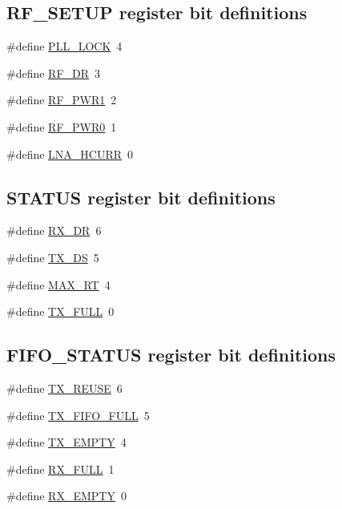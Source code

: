 \subsection*{RF\_\-SETUP register bit definitions}
\begin{DoxyCompactItemize}
\item 
\#define \hyperlink{group__nordic__hal__nrf__reg_gaf76cfc0d6ed71259b4a237cbd8e30624}{PLL\_\-LOCK}~4
\item 
\#define \hyperlink{group__nordic__hal__nrf__reg_ga1447bd35f38d6cc6d6841ca29c514675}{RF\_\-DR}~3
\item 
\#define \hyperlink{group__nordic__hal__nrf__reg_ga9ef8b6a9d788c905195674100af554f6}{RF\_\-PWR1}~2
\item 
\#define \hyperlink{group__nordic__hal__nrf__reg_ga79a624eaa04efc1df9e05fb77142e269}{RF\_\-PWR0}~1
\item 
\#define \hyperlink{group__nordic__hal__nrf__reg_gad031c713aa7c96ca88a9710f25229495}{LNA\_\-HCURR}~0
\end{DoxyCompactItemize}
\subsection*{STATUS register bit definitions}
\begin{DoxyCompactItemize}
\item 
\#define \hyperlink{group__nordic__hal__nrf__reg_ga312d1f2745a86149b27cff7d61e715df}{RX\_\-DR}~6
\item 
\#define \hyperlink{group__nordic__hal__nrf__reg_gab5f5243908a39ffd514fe701e9749bdc}{TX\_\-DS}~5
\item 
\#define \hyperlink{group__nordic__hal__nrf__reg_gab4482ead4f3b452a032f63ac03ee1870}{MAX\_\-RT}~4
\item 
\#define \hyperlink{group__nordic__hal__nrf__reg_gaf3b1baf3a7a57b7471443d1ff002c778}{TX\_\-FULL}~0
\end{DoxyCompactItemize}
\subsection*{FIFO\_\-STATUS register bit definitions}
\begin{DoxyCompactItemize}
\item 
\#define \hyperlink{group__nordic__hal__nrf__reg_ga506a58de7b75af27e3745db3e1e9733c}{TX\_\-REUSE}~6
\item 
\#define \hyperlink{group__nordic__hal__nrf__reg_ga22d7127287df037834795bbf984d7796}{TX\_\-FIFO\_\-FULL}~5
\item 
\#define \hyperlink{group__nordic__hal__nrf__reg_gae4034d6a21b6646c8710d09e43bd9383}{TX\_\-EMPTY}~4
\item 
\#define \hyperlink{group__nordic__hal__nrf__reg_ga70c7df60fd47492ea236dc14c1f9e216}{RX\_\-FULL}~1
\item 
\#define \hyperlink{group__nordic__hal__nrf__reg_ga8e43dfdec50b513f49b623e9da3def46}{RX\_\-EMPTY}~0
\end{DoxyCompactItemize}


